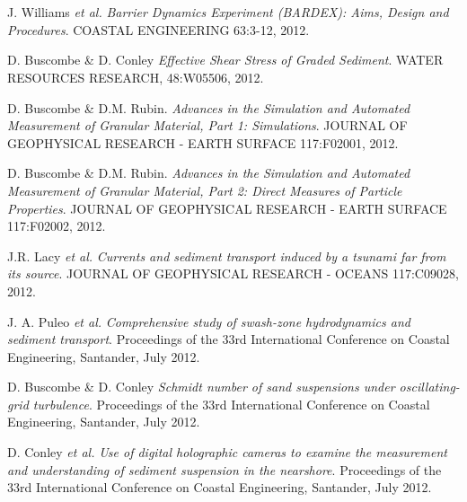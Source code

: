 \documentclass{article} %
\def\sf{\sffamily}
\def\sl{\slshape}
\newlength\sidebarwidth
\newcommand{\subtopic}[3][]
	 {\begin{minipage}{\textwidth}
	 \vspace*{.4\baselineskip}
         \nopagebreak\hspace{0in}%
         \nopagebreak\begin{minipage}[t]{\sidebarwidth - .2cm}
         \raggedleft {\sf\fontseries{sbc}\selectfont #2}
         {\\[-0.2\baselineskip] \textcolor{gray}{\footnotesize #1}}
	 \end{minipage}%
	 \hfill
	 \begin{minipage}[t]{\linewidth - \sidebarwidth}
	 #3%
	 \end{minipage}%
	 \vspace*{.2\baselineskip plus 1\baselineskip minus
	 .2\baselineskip}%
	 \end{minipage}}
\begin{document}
\subtopic{\hspace*{-3ex} 2012}{~
  \begin{itemize}[leftmargin=0ex, itemsep=0ex, parsep=.5ex, labelindent=-4ex]

    \publication
      J. Williams {\sl et al.}
      {\sl Barrier Dynamics Experiment (BARDEX): Aims, Design and Procedures}.
      COASTAL ENGINEERING 63:3-12, 2012.

    \publication
      D. Buscombe \& D. Conley
      {\sl Effective Shear Stress of Graded Sediment}.
      WATER RESOURCES RESEARCH, 48:W05506, 2012.

    \publication
      D. Buscombe \& D.M. Rubin.
      {\sl Advances in the Simulation and Automated Measurement of Granular Material, Part 1: Simulations}.
      JOURNAL OF GEOPHYSICAL RESEARCH - EARTH SURFACE 117:F02001, 2012.

    \publication
      D. Buscombe \& D.M. Rubin.
      {\sl Advances in the Simulation and Automated Measurement of Granular Material, Part 2: Direct Measures of Particle Properties}.
      JOURNAL OF GEOPHYSICAL RESEARCH - EARTH SURFACE 117:F02002, 2012.

    \publication
      J.R. Lacy {\sl et al.}
      {\sl Currents and sediment transport induced by a tsunami far from its source}.
      JOURNAL OF GEOPHYSICAL RESEARCH - OCEANS 117:C09028, 2012.

    \publication
      J. A. Puleo {\sl et al.}
      {\sl Comprehensive study of swash-zone hydrodynamics and sediment transport}.
      Proceedings of the 33rd International Conference on Coastal Engineering, Santander, July 2012.

    \publication
      D. Buscombe \& D. Conley
      {\sl Schmidt number of sand suspensions under oscillating-grid turbulence}.
      Proceedings of the 33rd International Conference on Coastal Engineering, Santander, July 2012.

    \publication
      D. Conley {\sl et al.}
      {\sl Use of digital holographic cameras to examine the measurement and understanding of sediment suspension in the nearshore}.
      Proceedings of the 33rd International Conference on Coastal Engineering, Santander, July 2012.

    \end{itemize}
}
\end{document}
